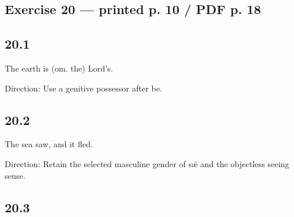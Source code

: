 \subsection*{Exercise 20 — printed p. 10 /\allowbreak{} PDF p. 18}

\subsection*{20.1}

\par\begin{minipage}{\linewidth}\raggedright
The earth is (om. the) Lord’s.

Direction: Use a genitive possessor after be.

\end{minipage}\par\addvspace{4pt}

\subsection*{20.2}

\par\begin{minipage}{\linewidth}\raggedright
The sea saw, and it fled.

Direction: Retain the selected masculine gender of sǣ and the objectless seeing sense.

\end{minipage}\par\addvspace{4pt}

\subsection*{20.3}

